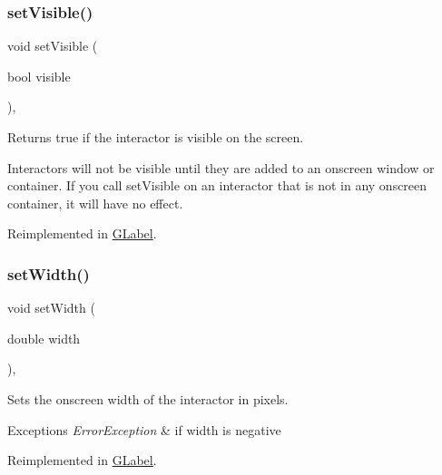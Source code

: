 \subsubsection{\texorpdfstring{set\+Visible()}{setVisible()}}
{\footnotesize\ttfamily void set\+Visible (\begin{DoxyParamCaption}\item[{bool}]{visible }\end{DoxyParamCaption})\hspace{0.3cm}{\ttfamily [virtual]}, {\ttfamily [inherited]}}



Returns true if the interactor is visible on the screen. 

Interactors will not be visible until they are added to an onscreen window or container. If you call set\+Visible on an interactor that is not in any onscreen container, it will have no effect. 

Reimplemented in \mbox{\hyperlink{classGLabel_afcc2a51afef8e2e61d8d9191386fb93f}{G\+Label}}.

\mbox{\label{classGInteractor_aa3f3fba4cb131baa8696ba01e3bceca1}} 
\subsubsection{\texorpdfstring{set\+Width()}{setWidth()}}
{\footnotesize\ttfamily void set\+Width (\begin{DoxyParamCaption}\item[{double}]{width }\end{DoxyParamCaption})\hspace{0.3cm}{\ttfamily [virtual]}, {\ttfamily [inherited]}}



Sets the onscreen width of the interactor in pixels. 


\begin{DoxyExceptions}{Exceptions}
{\em Error\+Exception} & if width is negative \\
\hline
\end{DoxyExceptions}


Reimplemented in \mbox{\hyperlink{classGLabel_af0c5b6fb4e3c3c9a3fabde548efa93db}{G\+Label}}.

\mbox{\label{classGInteractor_a9c18fcc579333bf9653d13ad2b372e39}} 
